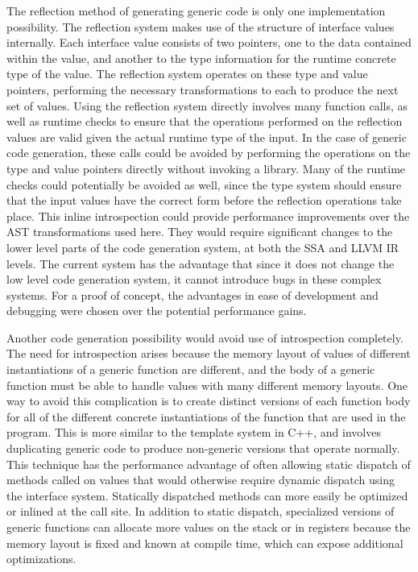 \documentclass[letterpaper,twocolumn,11pt]{article}
\begin{document}
The reflection method of generating generic code is only one implementation possibility. The reflection system makes use of the structure of interface values internally. Each interface value consists of two pointers, one to the data contained within the value, and another to the type information for the runtime concrete type of the value. The reflection system operates on these type and value pointers, performing the necessary transformations to each to produce the next set of values. Using the reflection system directly involves many function calls, as well as runtime checks to ensure that the operations performed on the reflection values are valid given the actual runtime type of the input. In the case of generic code generation, these calls could be avoided by performing the operations on the type and value pointers directly without invoking a library. Many of the runtime checks could potentially be avoided as well, since the type system should ensure that the input values have the correct form before the reflection operations take place. This inline introspection could provide performance improvements over the AST transformations used here. They would require significant changes to the lower level parts of the code generation system, at both the SSA and LLVM IR levels. The current system has the advantage that since it does not change the low level code generation system, it cannot introduce bugs in these complex systems. For a proof of concept, the advantages in ease of development and debugging were chosen over the potential performance gains.

Another code generation possibility would avoid use of introspection completely. The need for introspection arises because the memory layout of values of different instantiations of a generic function are different, and the body of a generic function must be able to handle values with many different memory layouts. One way to avoid this complication is to create distinct versions of each function body for all of the different concrete instantiations of the function that are used in the program. This is more similar to the template system in C++, and involves duplicating generic code to produce non-generic versions that  operate normally. This technique has the performance advantage of often allowing static dispatch of methods called on values that would otherwise require dynamic dispatch using the interface system. Statically dispatched methods can more easily be optimized or inlined at the call site. In addition to static dispatch, specialized versions of generic functions can allocate more values on the stack or in registers because the memory layout is fixed and known at compile time, which can expose additional optimizations. 
\end{document}

